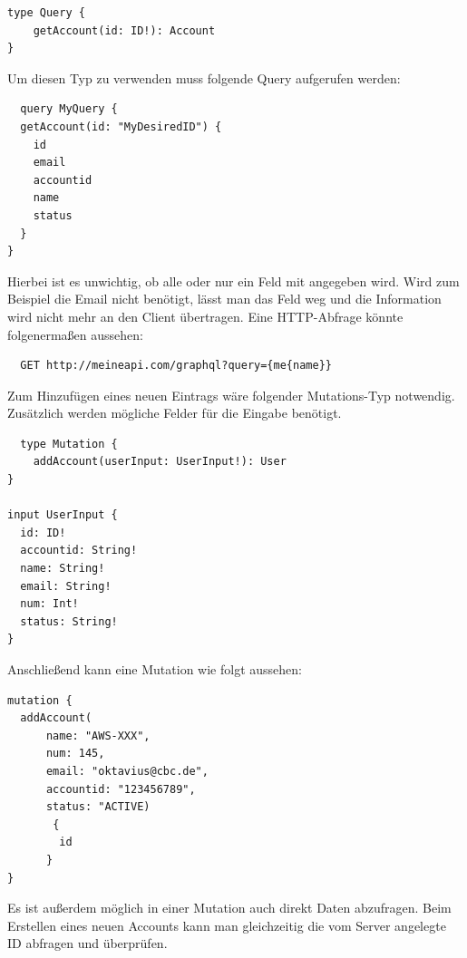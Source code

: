 \begin{verbatim}
type Query {
	getAccount(id: ID!): Account
}

\end{verbatim}

Um diesen Typ zu verwenden muss folgende Query aufgerufen werden:

\begin{verbatim}
  query MyQuery {
  getAccount(id: "MyDesiredID") {
    id
    email
    accountid
    name
    status
  }
}

\end{verbatim}

Hierbei ist es unwichtig, ob alle oder nur ein Feld mit angegeben wird.
Wird zum Beispiel die Email nicht benötigt, lässt man das Feld weg und die Information wird nicht mehr an den Client übertragen.\cite[]{GraphQL1}
Eine HTTP-Abfrage könnte folgenermaßen aussehen\cite[]{GraphQLHTTP}:

\begin{verbatim}
  GET http://meineapi.com/graphql?query={me{name}}

\end{verbatim}


Zum Hinzufügen eines neuen Eintrags wäre folgender Mutations-Typ notwendig.
Zusätzlich werden mögliche Felder für die Eingabe benötigt.


\begin{verbatim}
  type Mutation {
    addAccount(userInput: UserInput!): User
}

input UserInput {
  id: ID!
  accountid: String!
  name: String!
  email: String!
  num: Int!
  status: String!
}
\end{verbatim}

Anschließend kann eine Mutation wie folgt aussehen:

\begin{verbatim}
mutation {
  addAccount(
      name: "AWS-XXX",
      num: 145,
      email: "oktavius@cbc.de",
      accountid: "123456789",
      status: "ACTIVE)
       {
        id
      }
}
\end{verbatim}

Es ist außerdem möglich in einer Mutation auch direkt Daten abzufragen. Beim Erstellen eines neuen Accounts kann man gleichzeitig die
vom Server angelegte ID abfragen und überprüfen.\cite[]{GraphQL1}

